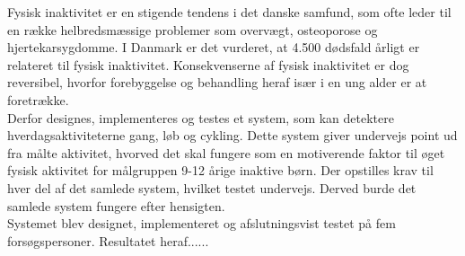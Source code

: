 Fysisk inaktivitet er en stigende tendens i det danske samfund, som ofte leder til en række helbredsmæssige problemer som overvægt, osteoporose og hjertekarsygdomme. I Danmark er det vurderet, at 4.500 dødsfald årligt er relateret til fysisk inaktivitet. Konsekvenserne af fysisk inaktivitet er dog reversibel, hvorfor forebyggelse og behandling heraf især i en ung alder er at foretrække.\\
Derfor designes, implementeres og testes et system, som kan detektere hverdagsaktiviteterne gang, løb og cykling. Dette system giver undervejs point ud fra målte aktivitet, hvorved det skal fungere som en motiverende faktor til øget fysisk aktivitet for målgruppen 9-12 årige inaktive børn. Der opstilles krav til hver del af det samlede system, hvilket testet undervejs. Derved burde det samlede system fungere efter hensigten.\\
Systemet blev designet, implementeret og afslutningsvist testet på fem forsøgspersoner. Resultatet heraf......